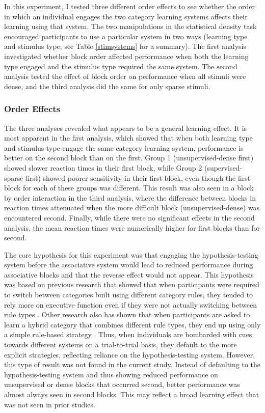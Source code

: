 \documentclass[../dissertation.tex]{subfiles}
\begin{document}
	In this experiment, I tested three different order effects to see whether the order in which an individual engages the two category learning systems affects their learning using that system. The two manipulations in the statistical density task encouraged participants to use a particular system in two ways (learning type and stimulus type; see Table \ref{stimsystems} for a summary). The first analysis investigated whether block order affected performance when both the learning type engaged and the stimulus type required the same system. The second analysis tested the effect of block order on performance when all stimuli were dense, and the third analysis did the same for only sparse stimuli. \par
	
\subsubsection{Order Effects}
	The three analyses revealed what appears to be a general learning effect. It is most apparent in the first analysis, which showed that when both learning type and stimulus type engage the same category learning system, performance is better on the second block than on the first. Group 1 (unsupervised-dense first) showed slower reaction times in their first block, while Group 2 (supervised-sparse first) showed poorer sensitivity in their first block, even though the first block for each of these groups was different. This result was also seen in a block by order interaction in the third analysis, where the difference between blocks in reaction times attenuated when the more difficult block (unsupervised-dense) was encountered second. Finally, while there were no significant effects in the second analysis, the mean reaction times were numerically higher for first blocks than for second. \par
	The core hypothesis for this experiment was that engaging the hypothesis-testing system before the associative system would lead to reduced performance during associative blocks and that the reverse effect would not appear. This hypothesis was based on previous research that showed that when participants were required to switch between categories built using different category rules, they tended to rely more on executive function even if they were not actually switching between rule types \citep{Erickson2008}. Other research also has shown that when participants are asked to learn a hybrid category that combines different rule types, they end up using only a simple rule-based strategy \citep{Ashby2010}. Thus, when individuals are bombarded with cues towards different systems on a trial-to-trial basis, they default to the more explicit strategies, reflecting reliance on the hypothesis-testing system. However, this type of result was not found in the current study. Instead of defaulting to the hypothesis-testing system and thus showing reduced performance on unsupervised or dense blocks that occurred second, better performance was almost always seen in second blocks. This may reflect a broad learning effect that was not seen in prior studies. \par
\end{document}
